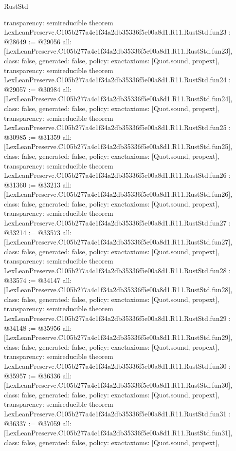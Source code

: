 \begin{lexlean}{RustStd}
\begin{coremodule}
{  transparency: semireducible
}
theorem LexLeanPreserve.C105b277a4c1f34a2db35336f5e00a8d1.R11.RustStd.fun23 : @28649 := @29056 {
  all: [LexLeanPreserve.C105b277a4c1f34a2db35336f5e00a8d1.R11.RustStd.fun23],
  class: false,
  generated: false,
  policy: exact{axioms: [Quot.sound, propext]},
  transparency: semireducible
}
theorem LexLeanPreserve.C105b277a4c1f34a2db35336f5e00a8d1.R11.RustStd.fun24 : @29057 := @30984 {
  all: [LexLeanPreserve.C105b277a4c1f34a2db35336f5e00a8d1.R11.RustStd.fun24],
  class: false,
  generated: false,
  policy: exact{axioms: [Quot.sound, propext]},
  transparency: semireducible
}
theorem LexLeanPreserve.C105b277a4c1f34a2db35336f5e00a8d1.R11.RustStd.fun25 : @30985 := @31359 {
  all: [LexLeanPreserve.C105b277a4c1f34a2db35336f5e00a8d1.R11.RustStd.fun25],
  class: false,
  generated: false,
  policy: exact{axioms: [Quot.sound, propext]},
  transparency: semireducible
}
theorem LexLeanPreserve.C105b277a4c1f34a2db35336f5e00a8d1.R11.RustStd.fun26 : @31360 := @33213 {
  all: [LexLeanPreserve.C105b277a4c1f34a2db35336f5e00a8d1.R11.RustStd.fun26],
  class: false,
  generated: false,
  policy: exact{axioms: [Quot.sound, propext]},
  transparency: semireducible
}
theorem LexLeanPreserve.C105b277a4c1f34a2db35336f5e00a8d1.R11.RustStd.fun27 : @33214 := @33573 {
  all: [LexLeanPreserve.C105b277a4c1f34a2db35336f5e00a8d1.R11.RustStd.fun27],
  class: false,
  generated: false,
  policy: exact{axioms: [Quot.sound, propext]},
  transparency: semireducible
}
theorem LexLeanPreserve.C105b277a4c1f34a2db35336f5e00a8d1.R11.RustStd.fun28 : @33574 := @34147 {
  all: [LexLeanPreserve.C105b277a4c1f34a2db35336f5e00a8d1.R11.RustStd.fun28],
  class: false,
  generated: false,
  policy: exact{axioms: [Quot.sound, propext]},
  transparency: semireducible
}
theorem LexLeanPreserve.C105b277a4c1f34a2db35336f5e00a8d1.R11.RustStd.fun29 : @34148 := @35956 {
  all: [LexLeanPreserve.C105b277a4c1f34a2db35336f5e00a8d1.R11.RustStd.fun29],
  class: false,
  generated: false,
  policy: exact{axioms: [Quot.sound, propext]},
  transparency: semireducible
}
theorem LexLeanPreserve.C105b277a4c1f34a2db35336f5e00a8d1.R11.RustStd.fun30 : @35957 := @36336 {
  all: [LexLeanPreserve.C105b277a4c1f34a2db35336f5e00a8d1.R11.RustStd.fun30],
  class: false,
  generated: false,
  policy: exact{axioms: [Quot.sound, propext]},
  transparency: semireducible
}
theorem LexLeanPreserve.C105b277a4c1f34a2db35336f5e00a8d1.R11.RustStd.fun31 : @36337 := @37059 {
  all: [LexLeanPreserve.C105b277a4c1f34a2db35336f5e00a8d1.R11.RustStd.fun31],
  class: false,
  generated: false,
  policy: exact{axioms: [Quot.sound, propext]},
}
\end{coremodule}
\end{lexlean}
